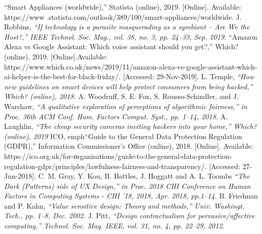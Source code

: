 \documentclass[a4paper]{article}
\begin{document}
\appendix

\begin{thebibliography}{seminarski}

 “Smart Appliances (worldwide),” Statista (online), 2019. [Online]. Available: https://www .statista.com/outlook/389/100/smart-appliances/worldwide.
 J. Robbins, \emph{“If technology is a parasite masquerading as a symbiont – Are We the Host?,” IEEE Technol. Soc. Mag., vol. 38, no. 3, pp. 24–33, Sep. 2019.}
 “Amazon Alexa vs Google Assistant: Which voice assistant should you get?,” Which? (online), 2019.
            [Online].Available: https://www.which.co.uk/news/2019/11/amazon-alexa-vs-google-assistant-which-ai-helper-is-the-best-for-black-friday/. [Accessed: 29-Nov-2019].
 L. Temple, \emph{“How new guidelines on smart devices will help protect consumers from being hacked,” Which? (online), 2018.}
 A. Woodruff, S. E. Fox, S. Rousso-Schindler, and J. Warshaw, \emph{“A qualitative exploration of perceptions of algorithmic fairness,” in Proc. 36th ACM Conf. Hum. Factors Comput. Syst., pp. 1–14, 2018.}
 A. Laughlin, \emph{“The cheap security cameras inviting hackers into your home,” Which? (online), 2019}
 ICO,  emph{“Guide  to  the  General  Data  Protection  Regulation  (GDPR),”}  Information Commissioner’s  Office  (online),  2018. [Online].  Available:
            https://ico.org.uk/for-оrganisations/guide-to-the-general-data-protection-regulation-gdpr/principles/lawfulness-fairness-and-transparency/. [Accessed: 27-Jun-2018].
 C. M. Gray, Y. Kou, B. Battles, J. Hoggatt and A. L. Toombs \emph{“The Dark (Patterns) side of UX Design,” in Proc. 2018 CHI Conference on Human Factors in Computing Systems - CHI ’18, 2018, Apr. 2018, pp.1–14.}
 B.  Friedman  and  P.  Kahn, \emph{“Value sensitive design: Theory and methods,” Univ. Washingt. Tech., pp. 1–8, Dec. 2002.}
 J.  Pitt,  \emph{“Design contractualism for pervasive/affective computing,” Technol. Soc. Mag. IEEE, vol. 31, no. 4, pp. 22–29, 2012.}

\end{thebibliography}
\end{document}
